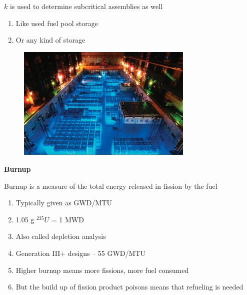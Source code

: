 \documentclass[aspectratio=1610,pdftex,dvipsnames,compress,xcolor={dvipsnames}]{beamer}
\begin{document}
\begin{frame}{$k$ is used to determine subcritical assemblies as well}
    \begin{enumerate}[series=outerlist,topsep=0pt,itemsep=21pt,leftmargin=*,label=(\arabic*)]
        \item[]Like used fuel pool storage
        \item[]Or any kind of storage
    \end{enumerate}
\end{frame}


\begin{frame}{}
    \begin{figure}
        \centering
        \includegraphics[width=0.75\textwidth]{used.fuel.pool.jpg}
    \end{figure}
\end{frame}


\begin{frame}[plain]{}
    \centering\LARGE\textbf{Burnup}
\end{frame}


\addtocounter{framenumber}{-1} 
\begin{frame}{Burnup is a measure of the total energy released in fission by the fuel}
    \begin{enumerate}[series=outerlist,topsep=0pt,itemsep=21pt,leftmargin=*,label=(\arabic*)]
        \item[]Typically given as GWD/MTU
        \item[]1.05 g $^{235}U$ = 1 MWD
        \item[]Also called depletion analysis
        \item[]Generation III+ designs -- 55 GWD/MTU
        \item[]Higher burnup means more fissions, more fuel consumed
        \item[]But the build up of fission product poisons means that refueling is needed
    \end{enumerate}
\end{frame}
\end{document}
